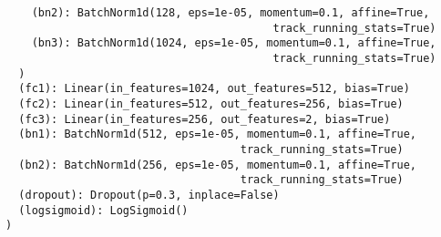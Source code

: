 \begin{verbatim}
    (bn2): BatchNorm1d(128, eps=1e-05, momentum=0.1, affine=True,
                                         track_running_stats=True)
    (bn3): BatchNorm1d(1024, eps=1e-05, momentum=0.1, affine=True,
                                         track_running_stats=True)
  )
  (fc1): Linear(in_features=1024, out_features=512, bias=True)
  (fc2): Linear(in_features=512, out_features=256, bias=True)
  (fc3): Linear(in_features=256, out_features=2, bias=True)
  (bn1): BatchNorm1d(512, eps=1e-05, momentum=0.1, affine=True,
                                    track_running_stats=True)
  (bn2): BatchNorm1d(256, eps=1e-05, momentum=0.1, affine=True,
                                    track_running_stats=True)
  (dropout): Dropout(p=0.3, inplace=False)
  (logsigmoid): LogSigmoid()
)
\end{verbatim}

